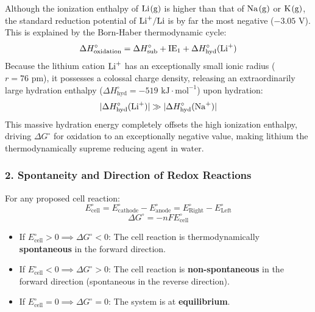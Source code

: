 \begin{atkinsbox}
Although the ionization enthalpy of $\ce{Li(g)}$ is higher than that of $\ce{Na(g)}$ or $\ce{K(g)}$, the standard reduction potential of $\ce{Li+/Li}$ is by far the most negative ($-3.05\text{ V}$). This is explained by the Born-Haber thermodynamic cycle:
\begin{equation}
    \Delta H^\circ_{\text{oxidation}} = \Delta H^\circ_{\text{sub}} + \text{IE}_1 + \Delta H^\circ_{\text{hyd}}(\ce{Li+})
\end{equation}
Because the lithium cation $\ce{Li+}$ has an exceptionally small ionic radius ($r = 76\text{ pm}$), it possesses a colossal charge density, releasing an extraordinarily large hydration enthalpy ($\Delta H^\circ_{\text{hyd}} = -519\text{ kJ}\cdot\text{mol}^{-1}$) upon hydration:
\begin{equation}
    |\Delta H^\circ_{\text{hyd}}(\ce{Li+})| \gg |\Delta H^\circ_{\text{hyd}}(\ce{Na+})|
\end{equation}
This massive hydration energy completely offsets the high ionization enthalpy, driving $\Delta G^\circ$ for oxidation to an exceptionally negative value, making lithium the thermodynamically supreme reducing agent in water.
\end{atkinsbox}

\subsubsection{2. Spontaneity and Direction of Redox Reactions}
For any proposed cell reaction:
\begin{equation}
    E^\circ_{\text{cell}} = E^\circ_{\text{cathode}} - E^\circ_{\text{anode}} = E^\circ_{\text{Right}} - E^\circ_{\text{Left}}
\end{equation}
\begin{equation}
    \Delta G^\circ = -n F E^\circ_{\text{cell}}
\end{equation}
\begin{itemize}[leftmargin=*]
    \item If $E^\circ_{\text{cell}} > 0 \implies \Delta G^\circ < 0$: The cell reaction is thermodynamically \textbf{spontaneous} in the forward direction.
    \item If $E^\circ_{\text{cell}} < 0 \implies \Delta G^\circ > 0$: The cell reaction is \textbf{non-spontaneous} in the forward direction (spontaneous in the reverse direction).
    \item If $E^\circ_{\text{cell}} = 0 \implies \Delta G^\circ = 0$: The system is at \textbf{equilibrium}.
\end{itemize}

